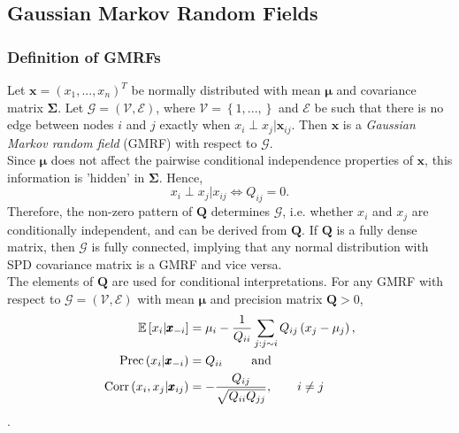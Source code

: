 \subsection{Gaussian Markov Random Fields}
\subsubsection{Definition of GMRFs}
Let $\pmb{x}=\left(x_1,...,x_n\right)^T$ be normally distributed with mean $\pmb{\mu}$ and covariance matrix $\pmb{\Sigma}$. Let $\mathcal{G}=\left(\mathcal{V}, \mathcal{E}\right)$, where $\mathcal{V}=\left\lbrace 1,...,\right\rbrace$ and $\mathcal{E}$ be such that there is no edge between nodes $i$ and $j$ exactly when $x_i\perp x_j|\pmb{x}_{ij}$. Then $\pmb{x}$ is a \textit{Gaussian Markov random field} (GMRF) with respect to $\mathcal{G}$. \\
Since $\pmb{\mu}$ does not affect the pairwise conditional independence properties of $\pmb{x}$, this information is 'hidden' in $\pmb{\Sigma}$. Hence,
\begin{equation*}
    x_i\perp x_j|x_{ij}\Longleftrightarrow Q_{ij}=0.
\end{equation*}
Therefore, the non-zero pattern of $\pmb{Q}$ determines $\mathcal{G}$, i.e. whether $x_i$ and $x_j$ are conditionally independent, and can be derived from $\pmb{Q}$. If $\pmb{Q}$ is a fully dense matrix, then $\mathcal{G}$ is fully connected, implying that any normal distribution with SPD covariance matrix is a GMRF and vice versa. \\
The elements of $\pmb{Q}$ are used for conditional interpretations. For any GMRF with respect to $\mathcal{G}=\left(\mathcal{V}, \mathcal{E}\right)$ with mean $\pmb{\mu}$ and precision matrix $\pmb{Q} > 0$,
\begin{align}
    \mathbb{E}\left[x_i|\pmb{x}_{-i}\right] &= \mu_i-\frac{1}{Q_{ii}}\sum_{j:j\sim i}Q_{ij}\left(x_j-\mu_j\right), \label{eq:mean_gmrf}\\
    \hbox{Prec}\left(x_i|\pmb{x}_{-i}\right) &= Q_{ii} \hspace{20pt}\hbox{ and }\label{eq:prec_gmrf}\\
    \hbox{Corr}\left(x_i,x_j|\pmb{x}_{ij}\right) &= -\frac{Q_{ij}}{\sqrt{Q_{ii}Q_{jj}}},\hspace{20pt} i\neq j
\end{align}
\autocite[][21]{rue2005gaussian}. \\
